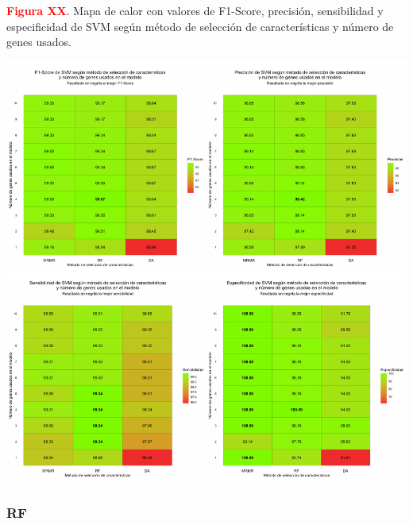 \newpage
\textbf{\textcolor{red}{Figura XX}}. Mapa de calor con valores de F1-Score, precisión, sensibilidad y especificidad de SVM según método de selección de características y número de genes usados.
\begin{center}
	\includegraphics[width=1\textwidth]{figuras/higado_biclase_heatmap_svm.pdf} \\
\end{center}

\newpage
\subsubsection{RF}

